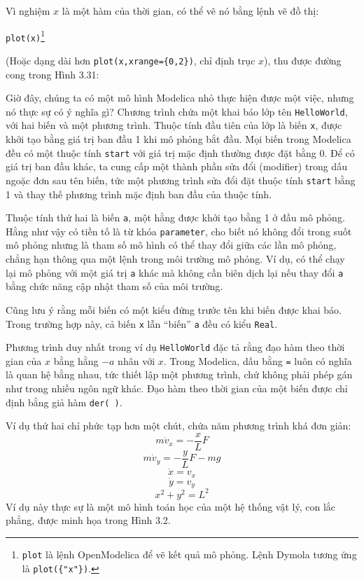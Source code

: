 Vì nghiệm $x$ là một hàm của thời gian, có thể vẽ nó bằng lệnh vẽ đồ thị:

\noindent\texttt{plot(x)}\footnote{\texttt{plot} là lệnh OpenModelica để vẽ kết quả mô phỏng. Lệnh Dymola tương ứng là \texttt{plot(\{"x"\})}.}

(Hoặc dạng dài hơn \texttt{plot(x,xrange=\{0,2\})}, chỉ định trục $x$), thu được đường cong trong Hình 3.31:

Giờ đây, chúng ta có một mô hình Modelica nhỏ thực hiện được một việc, nhưng nó thực sự có ý nghĩa gì? Chương trình chứa một khai báo lớp tên \texttt{HelloWorld}, với hai biến và một phương trình. Thuộc tính đầu tiên của lớp là biến \texttt{x}, được khởi tạo bằng giá trị ban đầu 1 khi mô phỏng bắt đầu. Mọi biến trong Modelica đều có một thuộc tính \texttt{start} với giá trị mặc định thường được đặt bằng 0. Để có giá trị ban đầu khác, ta cung cấp một thành phần sửa đổi (modifier) trong dấu ngoặc đơn sau tên biến, tức một phương trình sửa đổi đặt thuộc tính \texttt{start} bằng 1 và thay thế phương trình mặc định ban đầu của thuộc tính.

Thuộc tính thứ hai là biến \texttt{a}, một hằng được khởi tạo bằng 1 ở đầu mô phỏng. Hằng như vậy có tiền tố là từ khóa \texttt{parameter}, cho biết nó không đổi trong suốt mô phỏng nhưng là tham số mô hình có thể thay đổi giữa các lần mô phỏng, chẳng hạn thông qua một lệnh trong môi trường mô phỏng. Ví dụ, có thể chạy lại mô phỏng với một giá trị \texttt{a} khác mà không cần biên dịch lại nếu thay đổi \texttt{a} bằng chức năng cập nhật tham số của môi trường.

Cũng lưu ý rằng mỗi biến có một kiểu đứng trước tên khi biến được khai báo. Trong trường hợp này, cả biến \texttt{x} lẫn ``biến'' \texttt{a} đều có kiểu \texttt{Real}.

Phương trình duy nhất trong ví dụ \texttt{HelloWorld} đặc tả rằng đạo hàm theo thời gian của $x$ bằng hằng $-a$ nhân với $x$. Trong Modelica, dấu bằng \texttt{=} luôn có nghĩa là quan hệ bằng nhau, tức thiết lập một phương trình, chứ không phải phép gán như trong nhiều ngôn ngữ khác. Đạo hàm theo thời gian của một biến được chỉ định bằng giả hàm \texttt{der( )}.

Ví dụ thứ hai chỉ phức tạp hơn một chút, chứa năm phương trình khá đơn giản:
\begin{equation}m\dot{v}_x=-\frac{x}{L}F\tag{3.2}\end{equation}
\begin{equation}m\dot{v}_y=-\frac{y}{L}F-mg\tag{3.3}\end{equation}
\begin{equation}\dot{x}=v_x\tag{3.4}\end{equation}
\begin{equation}\dot{y}=v_y\tag{3.5}\end{equation}
\begin{equation}x^2+y^2=L^2\tag{3.6}\end{equation}
Ví dụ này thực sự là một mô hình toán học của một hệ thống vật lý, con lắc phẳng, được minh họa trong Hình 3.2.

